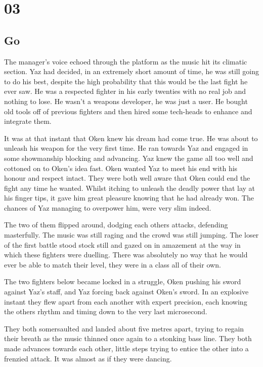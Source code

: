 \chapter{03}
\section{Go}


The manager's voice echoed through the platform as the music hit its climatic section. Yaz had decided, in an extremely short amount of time, he was still going to do his best, despite the high probability that this would be the last fight he ever saw. He was a respected fighter in his early twenties with no real job and nothing to lose. He wasn't a weapons developer, he was just a user. He bought old tools off of previous fighters and then hired some tech-heads to enhance and integrate them.

It was at that instant that Oken knew his dream had come true. He was about to unleash his weapon for the very first time. He ran towards Yaz and engaged in some showmanship blocking and advancing. Yaz knew the game all too well and cottoned on to Oken's idea fast. Oken wanted Yaz to meet his end with his honour and respect intact. They were both well aware that Oken could end the fight any time he wanted. Whilst itching to unleash the deadly power that lay at his finger tips, it gave him great pleasure knowing that he had already won. The chances of Yaz managing to overpower him, were very slim indeed.

The two of them flipped around, dodging each others attacks, defending masterfully. The music was still raging and the crowd was still jumping. The loser of the first battle stood stock still and gazed on in amazement at the way in which these fighters were duelling. There was absolutely no way that he would ever be able to match their level, they were in a class all of their own.

The two fighters below became locked in a struggle, Oken pushing his sword against Yaz's staff, and Yaz forcing back against Oken's sword. In an explosive instant they flew apart from each another with expert precision, each knowing the others rhythm and timing down to the very last microsecond.

They both somersaulted and landed about five metres apart, trying to regain their breath as the music thinned once again to a stonking bass line. They both made advances towards each other, little steps trying to entice the other into a frenzied attack. It was almost as if they were dancing.

